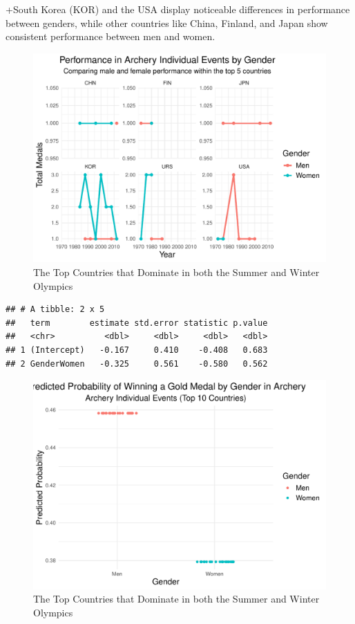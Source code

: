 \documentclass[
  12pt,
]{elsarticle}
\begin{document}
+South Korea (KOR) and the USA display noticeable differences in
performance between genders, while other countries like China, Finland,
and Japan show consistent performance between men and women.

\begin{figure}

{\centering \includegraphics{README_files/figure-latex/unnamed-chunk-6-1} 

}

\caption{The Top Countries that Dominate in both the Summer and Winter Olympics\label{Figure6}}\label{fig:unnamed-chunk-6}
\end{figure}

\begin{verbatim}
## # A tibble: 2 x 5
##   term        estimate std.error statistic p.value
##   <chr>          <dbl>     <dbl>     <dbl>   <dbl>
## 1 (Intercept)   -0.167     0.410    -0.408   0.683
## 2 GenderWomen   -0.325     0.561    -0.580   0.562
\end{verbatim}

\begin{figure}

{\centering \includegraphics{README_files/figure-latex/unnamed-chunk-7-1} 

}

\caption{The Top Countries that Dominate in both the Summer and Winter Olympics\label{Figure7}}\label{fig:unnamed-chunk-7}
\end{figure}
\end{document}
